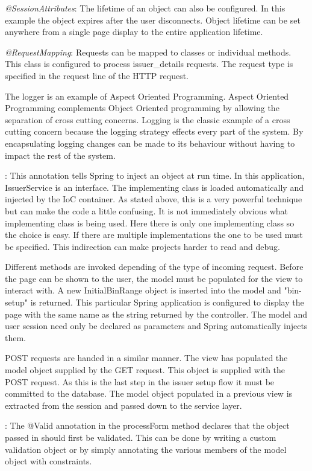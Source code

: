 \documentclass[a4paper, 11pt, titlepage]{article}
\begin{document}
\textit{@SessionAttributes}: The lifetime of an object can also be configured. In this example the object expires after the user disconnects. Object lifetime can be set anywhere from a single page display to the entire application lifetime. 
 
\textit{@RequestMapping}: Requests can be mapped to classes or individual methods. This class is configured to process issuer\_details requests. The request type is specified in the request line of the HTTP request. 
 
\label{aspects} 
The logger is an example of Aspect Oriented Programming. Aspect Oriented Programming complements Object Oriented programming by allowing the separation of cross cutting concerns. Logging is the classic example of a cross cutting concern because the logging strategy effects every part of the system. By encapsulating logging changes can be made to its behaviour without having to impact the rest of the system. 
\cite{AOP} 
 
: This annotation tells Spring to inject an object at run time. In this application, IssuerService is an interface. The implementing class is loaded automatically and injected by the IoC container. As stated above, this is a very powerful technique but can make the code a little confusing. It is not immediately obvious what implementing class is being used. Here there is only one implementing class so the choice is easy. If there are multiple implementations the one to be used must be specified. This indirection can make projects harder to read and debug. 
 
Different methods are invoked depending of the type of incoming request. Before the page can be shown to the user, the model must be populated for the view to interact with. A new InitialBinRange object is inserted into the model and "bin-setup" is returned. This particular Spring application is configured to display the page with the same name as the string returned by the controller. The model and user session need only be declared as parameters and Spring automatically injects them. 
 
POST requests are handed in a similar manner. The view has populated the model object supplied by the GET request. This object is supplied with the POST request. As this is the last step in the issuer setup flow it must be committed to the database. The model object populated in a previous view is extracted from the session and passed down to the service layer.  
 
: The @Valid annotation in the processForm method declares that the object passed in should first be validated. This can be done by writing a custom validation object or by simply annotating the various members of the model object with constraints.  
 
\end{document}
